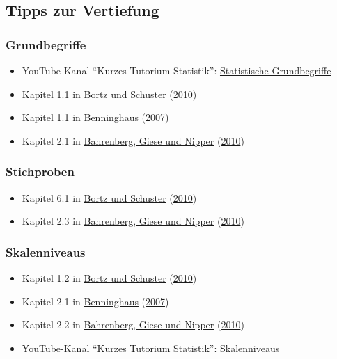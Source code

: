 \documentclass[
  ngerman,
]{article}
\providecommand{\tightlist}{%
  \setlength{\itemsep}{0pt}\setlength{\parskip}{0pt}}
\begin{document}
\hypertarget{tipps-zur-vertiefung}{%
\subsection{Tipps zur Vertiefung}\label{tipps-zur-vertiefung}}

\hypertarget{grundbegriffe}{%
\subsubsection{Grundbegriffe}\label{grundbegriffe}}

\begin{itemize}
\tightlist
\item
  YouTube-Kanal ``Kurzes Tutorium Statistik'': \href{https://www.youtube.com/watch?v=bJsBcLjke3Q}{Statistische Grundbegriffe}
\item
  Kapitel 1.1 in \protect\hyperlink{ref-bortz}{Bortz und Schuster} (\protect\hyperlink{ref-bortz}{2010})
\item
  Kapitel 1.1 in \protect\hyperlink{ref-benninghaus}{Benninghaus} (\protect\hyperlink{ref-benninghaus}{2007})
\item
  Kapitel 2.1 in \protect\hyperlink{ref-bahrenberg}{Bahrenberg, Giese und Nipper} (\protect\hyperlink{ref-bahrenberg}{2010})
\end{itemize}

\hypertarget{stichproben}{%
\subsubsection{Stichproben}\label{stichproben}}

\begin{itemize}
\tightlist
\item
  Kapitel 6.1 in \protect\hyperlink{ref-bortz}{Bortz und Schuster} (\protect\hyperlink{ref-bortz}{2010})
\item
  Kapitel 2.3 in \protect\hyperlink{ref-bahrenberg}{Bahrenberg, Giese und Nipper} (\protect\hyperlink{ref-bahrenberg}{2010})
\end{itemize}

\hypertarget{skalenniveaus-1}{%
\subsubsection{Skalenniveaus}\label{skalenniveaus-1}}

\begin{itemize}
\tightlist
\item
  Kapitel 1.2 in \protect\hyperlink{ref-bortz}{Bortz und Schuster} (\protect\hyperlink{ref-bortz}{2010})
\item
  Kapitel 2.1 in \protect\hyperlink{ref-benninghaus}{Benninghaus} (\protect\hyperlink{ref-benninghaus}{2007})
\item
  Kapitel 2.2 in \protect\hyperlink{ref-bahrenberg}{Bahrenberg, Giese und Nipper} (\protect\hyperlink{ref-bahrenberg}{2010})
\item
  YouTube-Kanal ``Kurzes Tutorium Statistik'': \href{https://www.youtube.com/watch?v=TV4tTtW4UBU}{Skalenniveaus}
\end{itemize}
\end{document}
